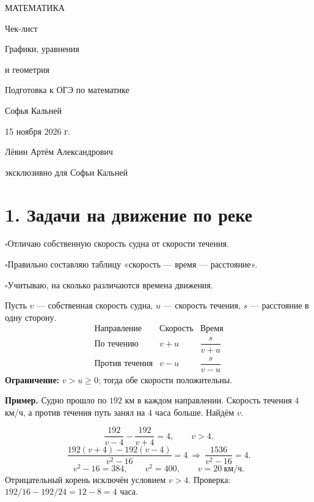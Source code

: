 \documentclass[a4paper,12pt]{article}
\newcommand{\key}[1]{\textcolor{darkaccent}{\textbf{#1}}}
\newcommand{\checkline}[1]{\par\noindent\textcolor{accent}{$\square$}\hspace{5pt}#1\par}
\newcommand{\ex}[1]{\par\smallskip\textcolor{darkaccent}{\textbf{Пример.}} #1\par}
\begin{document}
\thispagestyle{empty}
\begin{center}
\vspace*{28mm}
{\large\color{darkaccent} МАТЕМАТИКА}\par
\vspace{18mm}
{\Huge\color{textgray} Чек-лист}\par
\vspace{11mm}
{\LARGE\color{accent} Графики, уравнения\par и геометрия}\par
\vspace{13mm}
{\large Подготовка к ОГЭ по математике}\par
\vfill
{\large Софья Кальней}\par
\vspace{13mm}
{15 ноября 2026 г.}\par
\vspace{18mm}
{\small Лёвин Артём Александрович}\par
{\small эксклюзивно для Софьи Кальней}\par
\vspace{20mm}
\end{center}
\clearpage
\section*{1. Задачи на движение по реке}
\checkline{Отличаю собственную скорость судна от скорости течения.}
\checkline{Правильно составляю таблицу «скорость — время — расстояние».}
\checkline{Учитываю, на сколько различаются времена движения.}

Пусть $v$ --- собственная скорость судна, $u$ --- скорость течения, $s$ --- расстояние в одну сторону.
\[
\begin{array}{c|c|c}
\text{Направление}&\text{Скорость}&\text{Время}\\ \hline
\text{По течению}&v+u&\dfrac{s}{v+u}\\[5pt]
\text{Против течения}&v-u&\dfrac{s}{v-u}
\end{array}
\]
\key{Ограничение:} $v>u\ge 0$; тогда обе скорости положительны.

\ex{Судно прошло по $192$ км в каждом направлении. Скорость течения $4$ км/ч, а против течения путь занял на $4$ часа больше. Найдём $v$.}
\[
\frac{192}{v-4}-\frac{192}{v+4}=4,\qquad v>4.
\]
\[
\frac{192(v+4)-192(v-4)}{v^2-16}=4
\ \Longrightarrow\ \frac{1536}{v^2-16}=4.
\]
\[
v^2-16=384,\qquad v^2=400,\qquad \boxed{v=20\ \text{км/ч}}.
\]
Отрицательный корень исключён условием $v>4$. Проверка: $192/16-192/24=12-8=4$ часа.
\end{document}

